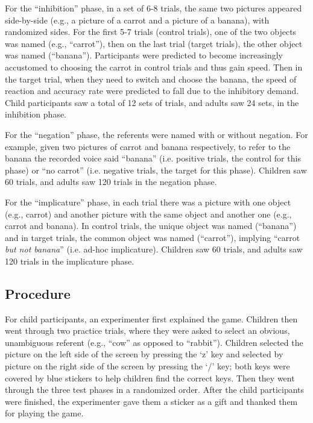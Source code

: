 \documentclass[10pt,letterpaper]{article}
\begin{document}
For the ``inhibition'' phase, in a set of 6-8 trials, the same two pictures appeared side-by-side (e.g., a picture of a carrot and a picture of a banana), with randomized sides. For the first 5-7 trials (control trials), one of the two objects was named (e.g., ``carrot''), then on the last trial  (target trials), the other object was named (``banana''). Participants were predicted to become increasingly accustomed to choosing the carrot in control trials and thus gain speed. Then in the target trial, when they need to switch and choose the banana, the speed of reaction and accuracy rate were predicted to fall due to the inhibitory demand. Child participants saw a total of 12 sets of trials, and adults saw 24 sets, in the inhibition phase.

For the ``negation'' phase, the referents were named with or without negation. For example, given two pictures of carrot and banana respectively, to refer to the banana the recorded voice said ``banana'' (i.e. positive trials, the control for this phase) or ``no carrot'' (i.e. negative trials, the target for this phase). Children saw 60 trials, and adults saw 120 trials in the negation phase. 

For the ``implicature'' phase, in each trial there was a picture with one object (e.g., carrot) and another picture with the same object and another one (e.g., carrot and banana). In control trials, the unique object was named (``banana'') and in target trials, the common object was named (``carrot''), implying ``carrot \emph{but not banana}'' (i.e. ad-hoc implicature). Children saw 60 trials, and adults saw 120 trials in the implicature phase.  

\subsection{Procedure}

For child participants, an experimenter first explained the game.  Children then went through two practice trials, where they were asked to select an obvious, unambiguous referent (e.g., ``cow'' as opposed to ``rabbit'').  Children selected the picture on the left side of the screen by pressing the `z' key and selected by picture on the right side of the screen by pressing the `/' key; both keys were covered by blue stickers to help children find the correct keys. Then they went through the three test phases in a randomized order.  After the child participants were finished, the experimenter gave them a sticker as a gift and thanked them for playing the game.
\end{document}
